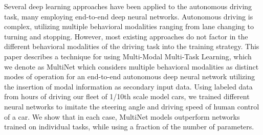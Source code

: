 Several deep learning approaches have been applied to the autonomous driving task, many employing end-to-end deep neural networks. Autonomous driving is complex, utilizing multiple behavioral modalities ranging from lane changing to turning and stopping. However, most existing approaches do not factor in the different behavioral modalities of the driving task into the training strategy. This paper describes a technique for using Multi-Modal Multi-Task Learning, which we denote as MultiNet which considers multiple behavioral modalities as distinct modes of operation for an end-to-end autonomous deep neural network utilizing the insertion of modal information as secondary input data. Using labeled data from hours of driving our fleet of 1/10th scale model cars, we trained different neural networks to imitate the steering angle and driving speed of human control of a car. We show that in each case, MultiNet models outperform networks trained on individual tasks, while using a fraction of the number of parameters.
